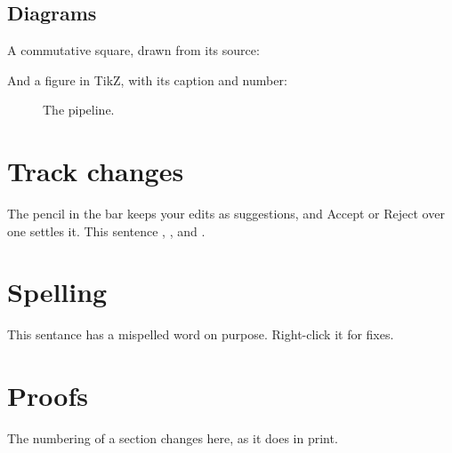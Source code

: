 \documentclass[11pt]{article}
\theoremstyle{definition}
\begin{document}
\subsection{Diagrams}

A commutative square, drawn from its source:


And a figure in TikZ, with its caption and number:

\begin{figure}[h]
\centering
{}
\caption{The pipeline.}\label{fig:pipeline}
\end{figure}



\section{Track changes}\label{sec:changes}

The pencil in the bar keeps your edits as suggestions, and Accept or Reject over one settles it. This
sentence , , and .

\section{Spelling}

This sentance has a mispelled word on purpose. Right-click it for fixes.

\appendix

\section{Proofs}\label{app:proofs}

The numbering of a section changes here, as it does in print.



\end{document}
